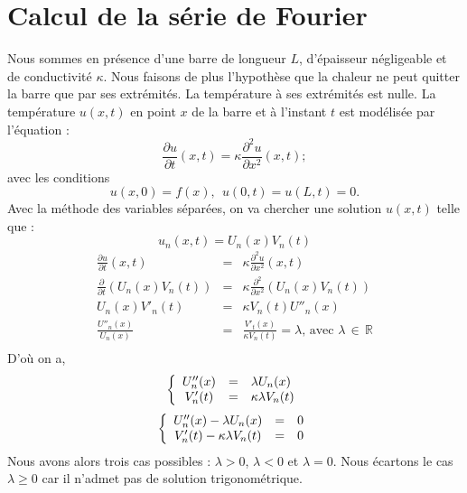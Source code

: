 \documentclass[a4paper,12pt]{report}
\begin{document}
\section{Calcul de la s\'erie de Fourier}
Nous sommes en pr\'esence d'une barre de longueur $L$, d'\'epaisseur n\'egligeable et de conductivit\'e $\kappa$. Nous faisons de plus l'hypoth\`ese que la chaleur ne peut quitter la barre que par ses extr\'emit\'es. La temp\'erature \`a ses extr\'emit\'es est nulle. La temp\'erature  $u(x,t)$ en point $x$ de la barre et \`a l'instant $t$ est mod\'elis\'ee par l'\'equation :
\begin{equation}\label{chaleur}
\frac{\partial u}{\partial t}(x,t)=\kappa  \frac{\partial^2 u}{\partial x^2}(x,t);
\end{equation}
avec les conditions 
\begin{equation}\label{cond_heat}
u(x,0)=f(x),~~u(0,t)=u(L,t)=0.
\end{equation}
Avec la m\'ethode des variables s\'epar\'ees, on va chercher une solution $u(x,t)$ telle que :
\begin{equation}\label{sepvar}
u_{n}(x,t)=U_{n}(x)V_{n}(t)
\end{equation}
\begin{eqnarray*}
	\frac{\partial u}{\partial t}(x,t)&=&\kappa  \frac{\partial^2 u}{\partial x^2}(x,t)\\
	\frac{\partial}{\partial t}(U_{n}(x)V_{n}(t))&=&\kappa  \frac{\partial^2}{\partial x^2}(U_{n}(x)V_{n}(t))\\
	U_{n}(x)V'_{n}(t)&=&\kappa V_{n}(t)U''_{n}(x)\\
	\frac{U''_{n}(x)}{U_{n}(x)}&=&\frac{V'_{t}(x)}{\kappa V_{n}(t)}=\lambda\text{, avec } \lambda\,\in\,\pmb{\mathbb{R}}\\
\end{eqnarray*}\newpage
D'o\`u on a,
\[ 
\left\{
  \begin{array}{c c l}
  U''_{n}(x)&=&\lambda U_{n}(x)\\
  V'_{n}(t)&=&\kappa\lambda V_{n}(t)\\
  \end{array}
\right.\]
\[ 
\left\{
  \begin{array}{c c l}
  U''_{n}(x)-\lambda U_{n}(x)&=&0\\
  V'_{n}(t)-\kappa\lambda V_{n}(t)&=&0\\
  \end{array}
\right.\]
Nous avons alors trois cas possibles : $\lambda > 0$, $\lambda < 0$ et $\lambda = 0$. Nous \'ecartons le cas $\lambda \geq 0$ car il n'admet pas de solution trigonom\'etrique.
\end{document}
